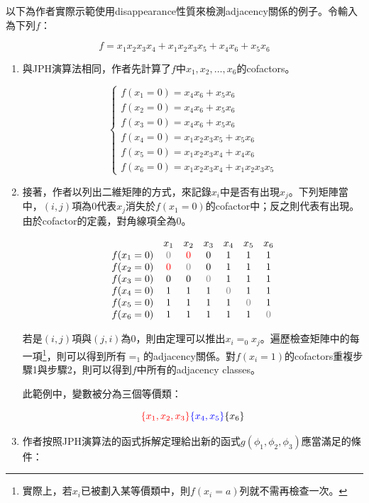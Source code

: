 \documentclass[
  12pt,
  paper=a4,
  ,captions=tableheading
]{scrartcl}
\begin{document}
以下為作者實際示範使用disappearance性質來檢測adjacency關係的例子。令輸入為下列\(f\)：

\[f = x_1x_2x_3x_4 + x_1x_2x_3x_5 + x_4x_6 + x_5x_6\]

\begin{enumerate}
\def\labelenumi{\arabic{enumi}.}
\item
  與JPH演算法相同，作者先計算了\(f\)中\(x_1, x_2, \dots, x_6\)的cofactors。

  \[\begin{cases}
  f(x_1 = 0) = x_4x_6+x_5x_6\\
  f(x_2 = 0) = x_4x_6+x_5x_6\\
  f(x_3 = 0) = x_4x_6+x_5x_6\\
  f(x_4 = 0) = x_1x_2x_3x_5+x_5x_6\\
  f(x_5 = 0) = x_1x_2x_3x_4+x_4x_6\\
  f(x_6 = 0) = x_1x_2x_3x_4+x_1x_2x_3x_5
  \end{cases}\]
\item
  接著，作者以列出二維矩陣的方式，來記錄\(x_i\)中是否有出現\(x_j\)。下列矩陣當中，\((i, j)\)項為\(0\)代表\(x_j\)消失於\(f(x_1 = 0)\)的cofactor中；反之則代表有出現。由於cofactor的定義，對角線項全為\(0\)。

  \[\begin{matrix}
  & x_1 & x_2 & x_3 & x_4 & x_5 & x_6\\
  f(x_1 = 0) & \textcolor{gray}{0} & \textcolor{red}{0} & 0 & 1 & 1 & 1\\
  f(x_2 = 0) & \textcolor{red}{0} & \textcolor{gray}{0} & 0 & 1 & 1 & 1\\
  f(x_3 = 0) & 0 & 0 & \textcolor{gray}{0} & 1 & 1 & 1\\
  f(x_4 = 0) & 1 & 1 & 1 & \textcolor{gray}{0} & 1 & 1\\
  f(x_5 = 0) & 1 & 1 & 1 & 1 & \textcolor{gray}{0} & 1\\
  f(x_6 = 0) & 1 & 1 & 1 & 1 & 1 & \textcolor{gray}{0}
  \end{matrix}\]

  若是\((i, j)\)項與\((j, i)\)為\(0\)，則由定理可以推出\(x_i =_0 x_j\)。遍歷檢查矩陣中的每一項\footnote{實際上，若\(x_i\)已被劃入某等價類中，則\(f(x_i=a)\)列就不需再檢查一次。}，則可以得到所有\(=_1\)的adjacency關係。對\(f(x_i = 1)\)的cofactors重複步驟1與步驟2，則可以得到\(f\)中所有的adjacency
  classes。

  此範例中，變數被分為三個等價類：

  \[\textcolor{red}{\{x_1, x_2, x_3\}} \textcolor{blue}{\{x_4, x_5\}} \{x_6\}\]
\item
  作者按照JPH演算法的函式拆解定理給出新的函式\(g(\phi_1, \phi_2, \phi_3)\)應當滿足的條件：


\end{enumerate}
\end{document}
